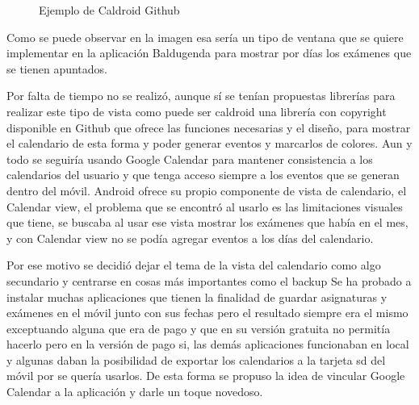\begin{figure}[H] 
  \begin{center} 
    \caption{Ejemplo de Caldroid Github} 
    \label{fig:Caldroid} 
  \end{center} 
\end{figure}

Como se puede observar en la imagen esa sería un tipo de ventana que se quiere implementar en la aplicación Baldugenda para mostrar por días los exámenes que se tienen apuntados.

Por falta de tiempo no se realizó, aunque sí se tenían propuestas librerías para realizar este tipo de vista como puede ser caldroid una librería con copyright disponible en Github que ofrece las funciones necesarias y el diseño, para mostrar el calendario de esta forma y poder generar eventos y marcarlos de colores.
Aun y todo se seguiría usando Google Calendar para mantener consistencia a los calendarios del usuario y que tenga acceso siempre a los eventos que se generan dentro del móvil.
Android ofrece su propio componente de vista de calendario, el Calendar view, el problema que se encontró al usarlo es las limitaciones visuales que tiene, se buscaba al usar ese vista mostrar los exámenes que había en el mes, y con Calendar view no se podía agregar eventos a los días del calendario.

Por ese motivo se decidió dejar el tema de la vista del calendario como algo secundario y centrarse en cosas más importantes como el backup
Se ha probado a instalar muchas aplicaciones que tienen la finalidad de guardar asignaturas y exámenes en el móvil junto con sus fechas pero el resultado siempre era el mismo exceptuando alguna que era de pago y que en su versión gratuita no permitía hacerlo pero en la versión de pago si, las demás aplicaciones funcionaban en local y algunas daban la posibilidad de exportar los calendarios a la tarjeta sd del móvil por se quería usarlos.
De esta forma se propuso la idea de vincular Google Calendar a la aplicación y darle un toque novedoso.

